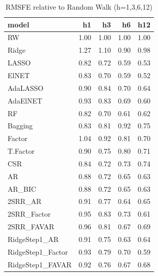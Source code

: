 \begin{table}[ht]
\centering
\begin{tabular}{lrrrr}
  \hline
model & h1 & h3 & h6 & h12 \\ 
  \hline
RW & 1.00 & 1.00 & 1.00 & 1.00 \\ 
  Ridge & 1.27 & 1.10 & 0.90 & 0.98 \\ 
  LASSO & 0.82 & 0.72 & 0.59 & 0.53 \\ 
  ElNET & 0.83 & 0.70 & 0.59 & 0.52 \\ 
  AdaLASSO & 0.90 & 0.84 & 0.70 & 0.64 \\ 
  AdaElNET & 0.93 & 0.83 & 0.69 & 0.60 \\ 
  RF & 0.82 & 0.70 & 0.61 & 0.62 \\ 
  Bagging & 0.83 & 0.81 & 0.92 & 0.75 \\ 
  Factor & 1.04 & 0.92 & 0.81 & 0.70 \\ 
  T.Factor & 0.90 & 0.75 & 0.80 & 0.71 \\ 
  CSR & 0.84 & 0.72 & 0.73 & 0.74 \\ 
  AR & 0.88 & 0.72 & 0.65 & 0.63 \\ 
  AR\_BIC & 0.88 & 0.72 & 0.65 & 0.63 \\ 
  2SRR\_AR & 0.91 & 0.77 & 0.64 & 0.65 \\ 
  2SRR\_Factor & 0.95 & 0.83 & 0.73 & 0.61 \\ 
  2SRR\_FAVAR & 0.96 & 0.81 & 0.67 & 0.69 \\ 
  RidgeStep1\_AR & 0.91 & 0.75 & 0.63 & 0.64 \\ 
  RidgeStep1\_Factor & 0.93 & 0.79 & 0.70 & 0.59 \\ 
  RidgeStep1\_FAVAR & 0.92 & 0.76 & 0.67 & 0.68 \\ 
   \hline
\end{tabular}
\caption{RMSFE relative to Random Walk (h=1,3,6,12)} 
\label{tab:rmsfe_rw}
\end{table}
